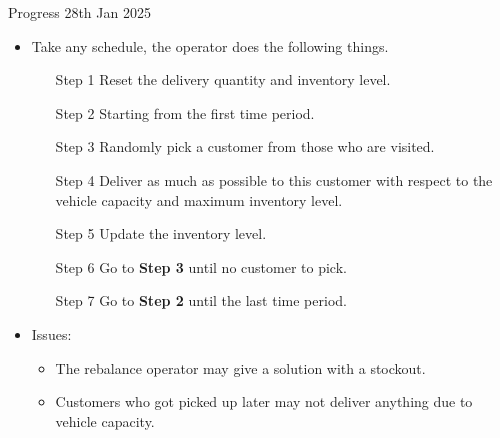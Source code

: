 \documentclass{beamer}
\begin{document}
\begin{frame}{Progress 28th Jan 2025}

\begin{itemize}
    \item Take any schedule, the operator does the following things.
    \begin{itemize} \setlength{\itemindent}{1em}
        \item [Step 1]  Reset the delivery quantity and inventory level.
        \item [Step 2] Starting from the first time period.
        \item [Step 3] Randomly pick a customer from those who are visited.
        \item [Step 4] Deliver as much as possible to this customer with respect to the vehicle capacity and maximum inventory level.
        \item [Step 5] Update the inventory level.
        \item [Step 6] Go to \textbf{Step 3} until no customer to pick.
        \item [Step 7] Go to \textbf{Step 2} until the last time period.
    \end{itemize}
    \item Issues:
    \begin{itemize}
        \item The rebalance operator may give a solution with a stockout.
        \item Customers who got picked up later may not deliver anything due to vehicle capacity.
    \end{itemize}  
\end{itemize}
\end{frame}
\end{document}
